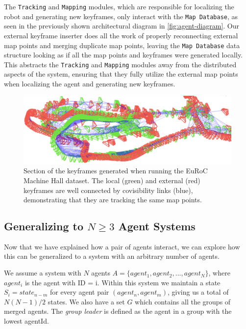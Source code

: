 The \texttt{Tracking} and \texttt{Mapping} modules, which are responsible for localizing the robot and generating new keyframes, only interact with the \texttt{Map Database}, as seen in the previously shown architectural diagram in \autoref{fig:agent-diagram}. Our external keyframe inserter does all the work of properly reconnecting external map points and merging duplicate map points, leaving the \texttt{Map Database} data structure looking as if all the map points and keyframes were generated locally. This abstracts the \texttt{Tracking} and \texttt{Mapping} modules away from the distributed aspects of the system, ensuring that they fully utilize the external map points when localizing the agent and generating new keyframes.


\begin{figure}[h]
    \centering
    \includegraphics[width=0.8\linewidth]{figures/map_integration.png}

    \caption{Section of the keyframes generated when running the EuRoC Machine Hall dataset. The local (green) and external (red) keyframes are well connected by covisibility links (blue), demonstrating that they are tracking the same map points.}
    \label{fig:simulation-environment}
\end{figure}

\subsection{Generalizing to $N \geq 3$ Agent Systems}
\label{sec:generalizing-to-n-geq-3-agent-systems}
Now that we have explained how a pair of agents interact, we can explore how this can be generalized to a system with an arbitrary number of agents.

We assume a system with $N$ agents $A=\{agent_1, agent_2, ..., agent_N\}$, where $agent_i$ is the agent with ID = i. Within this system we maintain a state $S_i=state_{n-m}$ for every agent pair $(agent_n, agent_m)$, giving us a total of $N(N-1)/2$ states. We also have a set $G$ which contains all the groups of merged agents. The \textit{group leader} is defined as the agent in a group with the lowest agentId.

